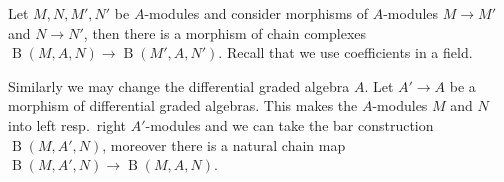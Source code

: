 \documentclass{scrartcl}
\theoremstyle{plain}
\theoremstyle{definition}
\DeclareMathOperator{\BC}{B}
\begin{document}


Let $M, N, M', N'$ be $A$-modules and consider morphisms of $A$-modules $M\to M'$ and $N\to N'$, then there is a morphism of chain complexes $\BC(M, A, N)\to \BC(M', A, N')$. Recall that we use coefficients in a field.

Similarly we may change the differential graded algebra $A$. Let $A'\to A$ be a morphism of differential graded algebras. This makes the $A$-modules $M$ and $N$ into left resp.\ right $A'$-modules and we can take the bar construction $\BC(M, A', N)$, moreover there is a natural chain map $\BC(M, A', N)\to \BC(M, A, N)$.
\end{document}
